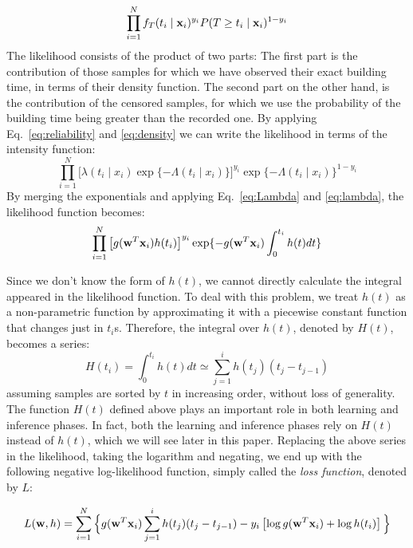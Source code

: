 \begin{equation}
\prod_{i=1}^{N}f_T(t_i\mid \mathbf{x}_i)^{y_i}P(T\ge t_i\mid \mathbf{x}_i)^{1-y_i}\\
\end{equation}
The likelihood consists of the product of two parts: The first part is the contribution of those samples for which we have observed their exact building time, in terms of their density function. The second part on the other hand, is the contribution of the censored samples, for which we use the probability of the building time being greater than the recorded one. By applying Eq.~\ref{eq:reliability} and \ref{eq:density} we can write the likelihood in terms of the intensity function:
\begin{equation}
\prod_{i=1}^{N}\big[\lambda(t_i\mid x_i)\exp\{-\Lambda(t_i\mid x_i)\}\big]^{y_i}\exp\lbrace-\Lambda(t_i\mid x_i)\rbrace^{1-y_i}
\end{equation}
By merging the exponentials and applying Eq.~\ref{eq:Lambda} and \ref{eq:lambda}, the likelihood function becomes:
\begin{equation}
\prod_{i=1}^{N}\left[g(\mathbf{w}^T\mathbf{x}_i)h(t_i)\right]^{y_i}\exp\lbrace-g(\mathbf{w}^T\mathbf{x}_i)\int_{0}^{t_i}h(t)dt\rbrace
\end{equation}

Since we don't know the form of $h(t)$, we cannot directly calculate the integral appeared in the likelihood function. To deal with this problem, we treat $h(t)$ as a non-parametric function by approximating it with a piecewise constant function that changes just in $t_i$s. Therefore, the integral over $h(t)$, denoted by $H(t)$, becomes a series:
\begin{equation}\label{eq:cumh}
H(t_i)=\int_{0}^{t_i}h(t)dt \simeq \sum_{j=1}^{i}h(t_j)(t_j-t_{j-1})
\end{equation}
assuming samples are sorted by $t$ in increasing order, without loss of generality. The function $H(t)$ defined above plays an important role in both learning and inference phases. In fact, both the learning and inference phases rely on $H(t)$ instead of $h(t)$, which we will see later in this paper.
Replacing the above series in the likelihood, taking the logarithm and negating, we end up with the following negative log-likelihood function, simply called the \emph{loss function}, denoted by $L$:

\begin{equation}\label{eq:logl}
\begin{split}
L(\mathbf{w},h)
=\sum_{i=1}^{N}\Big\lbrace g(\mathbf{w}^T\mathbf{x}_i)\sum_{j=1}^{i}h(t_j)(t_j-t_{j-1})-y_i\left[\log g(\mathbf{w}^T\mathbf{x}_i) + \log h(t_i)\right]\Big\rbrace\\
\end{split}
\end{equation}

